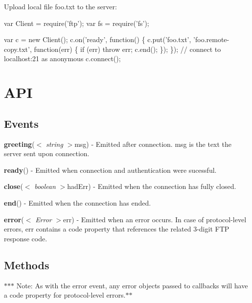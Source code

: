 \begin{DoxyItemize}
\item Upload local file \textquotesingle{}foo.\+txt\textquotesingle{} to the server\+:
\end{DoxyItemize}


\begin{DoxyCode}
var Client = require('ftp');
var fs = require('fs');

var c = new Client();
c.on('ready', function() \{
  c.put('foo.txt', 'foo.remote-copy.txt', function(err) \{
    if (err) throw err;
    c.end();
  \});
\});
// connect to localhost:21 as anonymous
c.connect();
\end{DoxyCode}


\section*{A\+PI }

\subsection*{Events }


\begin{DoxyItemize}
\item {\bfseries greeting}($<$ {\itshape string} $>$msg) -\/ Emitted after connection. {\ttfamily msg} is the text the server sent upon connection.
\item {\bfseries ready}() -\/ Emitted when connection and authentication were sucessful.
\item {\bfseries close}($<$ {\itshape boolean} $>$had\+Err) -\/ Emitted when the connection has fully closed.
\item {\bfseries end}() -\/ Emitted when the connection has ended.
\item {\bfseries error}($<$ {\itshape Error} $>$err) -\/ Emitted when an error occurs. In case of protocol-\/level errors, {\ttfamily err} contains a \textquotesingle{}code\textquotesingle{} property that references the related 3-\/digit F\+TP response code.
\end{DoxyItemize}

\subsection*{Methods }

$\ast$$\ast$$\ast$ Note\+: As with the \textquotesingle{}error\textquotesingle{} event, any error objects passed to callbacks will have a \textquotesingle{}code\textquotesingle{} property for protocol-\/level errors.$\ast$$\ast$


